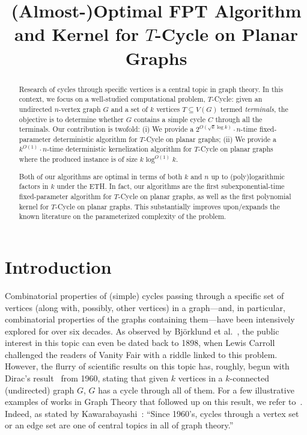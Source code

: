 \documentclass{article}
\title{(Almost-)Optimal FPT Algorithm and Kernel for {\sc $T$-Cycle} on Planar Graphs}
\author{Harmender Gahlawat\thanks{LIMOS, Université Clermont Auvergne, Clermont-Ferrand, France} \thanks{Laboratoire G-SCOP, Grenoble-INP, France} \\  \texttt{harmendergahlawat@gmail.com}
\and \and Abhishek Rathod\thanks{Ben-Gurion University of the Negev, Beersheba, Israel} \\  \texttt{arathod@post.bgu.ac.il}
\and \and Meirav Zehavi\footnotemark[3] \\  \texttt{meiravze@bgu.ac.il} }
\numberwithin{claimcounter}{lemma}
\begin{document}
\maketitle

\begin{abstract}
Research of cycles through specific vertices is a central topic in graph theory. In this context, we focus on a well-studied computational problem, {\sc $T$-Cycle}: given an undirected $n$-vertex graph $G$ and a set of  $k$ vertices $T\subseteq V(G)$ termed \textit{terminals}, the objective is to determine whether $G$ contains a simple cycle $C$ through all the terminals.
Our contribution is twofold: (i) We provide a $2^{O(\sqrt{k}\log k)}\cdot n$-time fixed-parameter deterministic algorithm for {\sc $T$-Cycle} on planar graphs; (ii) We provide a $k^{O(1)}\cdot n$-time deterministic kernelization algorithm for {\sc $T$-Cycle} on planar graphs where the produced instance is of size $k\log^{O(1)}k$. 

Both of our algorithms are optimal in terms of both $k$ and $n$ up to (poly)logarithmic factors in $k$ under the ETH.  In fact, our algorithms are the first subexponential-time fixed-parameter algorithm for {\sc $T$-Cycle} on planar graphs, as well as the first polynomial kernel for {\sc $T$-Cycle} on planar graphs. This substantially improves upon/expands the known literature on the parameterized complexity of the problem.
\end{abstract}

\section{Introduction}\label{S:intro}
Combinatorial properties of (simple) cycles passing through a specific set of vertices (along with, possibly, other vertices) in a graph---and, in particular, combinatorial properties of the graphs containing them---have been intensively explored for over six decades. As observed by Bj\"{o}rklund et al.~\cite{DBLP:conf/soda/BjorklundHT12}, the public interest in this topic can even be dated back to 1898, when Lewis Carroll challenged the readers of Vanity Fair with a riddle linked to this problem. However, the flurry of scientific results on this topic has, roughly, begun with Dirac's result~\cite{dirac1960abstrakten} from 1960, stating that given $k$ vertices in a $k$-connected (undirected) graph $G$, $G$ has a cycle through all of them. For a few illustrative examples of works in Graph Theory that followed up on this result, we refer to~\cite{bondy1981cycles,holton1982nine,kawarabayashi2004cycles,woodall1977circuits,erdHos1985any,sanders1996circuits,thomassen1977note,haggkvist1982circuits,kawarabayashi2002one}. Indeed, as stated by Kawarabayashi~\cite{kawarabayashi2008improved}: ``Since 1960’s, cycles through a vertex set or an edge set are one of central topics in all of graph theory.''
\end{document}
